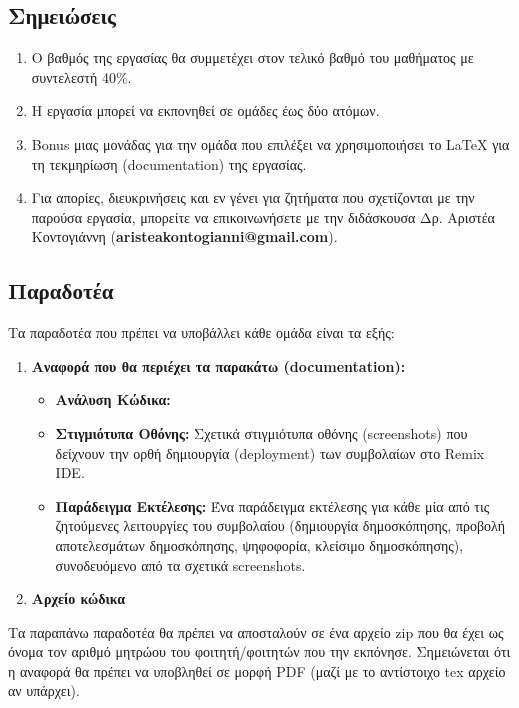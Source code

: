 \documentclass[12pt]{article}
\begin{document}
        \subsection*{Σημειώσεις}
        \begin{enumerate}
            \item Ο βαθμός της εργασίας θα συμμετέχει στον τελικό βαθμό του μαθήματος με συντελεστή 40\%.
            \item Η εργασία μπορεί να εκπονηθεί σε ομάδες έως δύο ατόμων.
            \item Bonus μιας μονάδας για την ομάδα που επιλέξει να χρησιμοποιήσει το LaTeX για τη τεκμηρίωση (documentation) της εργασίας.
            \item Για απορίες, διευκρινήσεις και εν γένει για ζητήματα που σχετίζονται με την παρούσα εργασία, μπορείτε να επικοινωνήσετε με την διδάσκουσα Δρ. Αριστέα Κοντογιάννη (\textbf{aristeakontogianni@gmail.com}).
        \end{enumerate}
        
        \subsection*{Παραδοτέα}
        Τα παραδοτέα που πρέπει να υποβάλλει κάθε ομάδα είναι τα εξής:
        \begin{enumerate}
            \item \textbf{Αναφορά που θα περιέχει τα παρακάτω (documentation):}
            \begin{itemize}
                \item \textbf{Ανάλυση Κώδικα:} 
                \item \textbf{Στιγμιότυπα Οθόνης:} Σχετικά στιγμιότυπα οθόνης (screenshots) που δείχνουν την ορθή δημιουργία (deployment) των συμβολαίων στο Remix IDE.
                \item \textbf{Παράδειγμα Εκτέλεσης:} Ένα παράδειγμα εκτέλεσης για κάθε μία από τις ζητούμενες λειτουργίες του συμβολαίου (δημιουργία δημοσκόπησης, προβολή αποτελεσμάτων δημοσκόπησης, ψηφοφορία, κλείσιμο δημοσκόπησης), συνοδευόμενο από τα σχετικά screenshots.
            \end{itemize}
            \item \textbf{Αρχείο κώδικα}
        \end{enumerate}

        Τα παραπάνω παραδοτέα θα πρέπει να αποσταλούν σε ένα αρχείο zip που θα έχει ως όνομα τον αριθμό μητρώου του φοιτητή/φοιτητών που την εκπόνησε. Σημειώνεται ότι η αναφορά θα πρέπει να υποβληθεί σε μορφή PDF (μαζί με το αντίστοιχο tex αρχείο αν υπάρχει).
\end{document}
